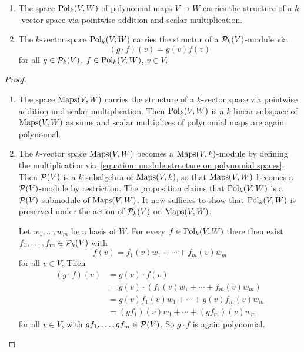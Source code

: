 \begin{proposition}
  \leavevmode
  \begin{enumerate}
    \item
      The space $\operatorname{Pol}_k(V,W)$ of polynomial maps $V \to W$ carries the structure of a $k$-vector space via pointwise addition and scalar multiplication.
    \item
      The $k$-vector space $\operatorname{Pol}_k(V,W)$ carries the structur of a $\mathcal{P}_k(V)$-module via
      \begin{equation}
      \label{equation: module structure on polynomial spaces}
          (g \cdot f)(v)
        = g(v) f(v)
      \end{equation}
      for all $g \in \mathcal{P}_k(V)$, $f \in \operatorname{Pol}_k(V,W)$, $v \in V$.
  \end{enumerate}
\end{proposition}
\begin{proof}
  \leavevmode
  \begin{enumerate}
    \item
      The space $\operatorname{Maps}(V,W)$ carries the structure of a $k$-vector space via pointwise addition und scalar multiplication.
      Then $\operatorname{Pol}_k(V,W)$ is a $k$-linear subspace of $\operatorname{Maps}(V,W)$ as sums and scalar multiplices of polynomial maps are again polynomial.
    \item
      The $k$-vector space $\operatorname{Maps}(V,W)$ becomes a $\operatorname{Maps}(V,k)$-module by defining the multiplication via~\eqref{equation: module structure on polynomial spaces}.
      Then $\mathcal{P}(V)$ is a $k$-subalgebra of $\operatorname{Maps}(V,k)$, so that $\operatorname{Maps}(V,W)$ becomes a $\mathcal{P}(V)$-module by restriction.
      The proposition claims that $\operatorname{Pol}_k(V,W)$ is a $\mathcal{P}(V)$-submodule of $\operatorname{Maps}(V,W)$.
      It now sufficies to show that $\operatorname{Pol}_k(V,W)$ is preserved under the action of $\mathcal{P}_k(V)$ on $\operatorname{Maps}(V,W)$.
      
      Let $w_1, \dotsc, w_m$ be a basis of $W$.
      For every $f \in \operatorname{Pol}_k(V,W)$ there then exist $f_1, \dotsc, f_m \in \mathcal{P}_k(V)$ with
      \[
          f(v)
        = f_1(v) w_1 + \dotsb + f_m(v) w_m
      \]
      for all $v \in V$.
      Then
      \begin{align*}
            (g \cdot f)(v)
        &=  g(v) \cdot f(v)                               \\
        &=  g(v) \cdot (f_1(v) w_1 + \dotsb + f_m(v) w_m) \\
        &=  g(v) f_1(v) w_1 + \dotsb + g(v) f_m(v) w_m    \\
        &=  (g f_1)(v) w_1 + \dotsb + (g f_m)(v) w_m
      \end{align*}
      for all $v \in V$, with $g f_1, \dotsc, g f_m \in \mathcal{P}(V)$.
      So $g \cdot f$ is again polynomial.
  \qedhere
  \end{enumerate}
\end{proof}


